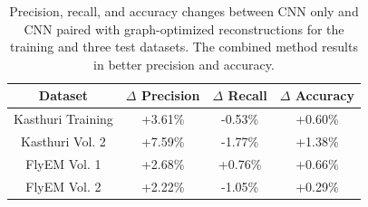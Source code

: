 \begin{table}[h]
	\centering
	\begin{tabular}{c c c c} \hline
		\textbf{Dataset} & $\Delta$ \textbf{Precision} & $\Delta$ \textbf{Recall} & $\Delta$ \textbf{Accuracy} \\ \hline
		Kasthuri Training & +3.61\% & -0.53\% & +0.60\% \\
		Kasthuri Vol. 2 & +7.59\% & -1.77\% & +1.38\% \\
		FlyEM Vol. 1 & +2.68\% & +0.76\% & +0.66\% \\
		FlyEM Vol. 2 & +2.22\% & -1.05\% & +0.29\% \\ \hline
	\end{tabular}
	\caption{Precision, recall, and accuracy changes between CNN only and CNN paired with graph-optimized reconstructions for the training and three test datasets. The combined method results in better precision and accuracy.}
	\label{table:multicut}
\end{table}
